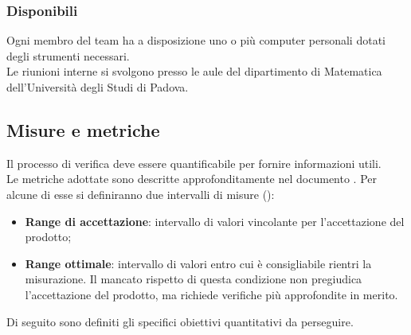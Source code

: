 \documentclass[../PianoDiQualifica.tex]{subfiles}
\begin{document}
			\subsubsection{Disponibili}
				Ogni membro del team ha a disposizione uno o più computer
				personali dotati degli strumenti necessari.\\
				Le riunioni interne si svolgono presso le aule del dipartimento
				di Matematica dell'Università degli Studi di Padova.
		\subsection{Misure e metriche}\label{sez:MisureEMetriche}
			Il processo di verifica deve essere quantificabile per fornire
			informazioni utili.\\
			Le metriche adottate sono descritte approfonditamente nel documento \normediprogetto.
			Per alcune di esse si definiranno due intervalli di misure ():
			\begin{itemize}
				\item \textbf{Range di accettazione}: intervallo di valori
				vincolante per l'accettazione del prodotto;
				\item \textbf{Range ottimale}: intervallo di valori entro cui è
				consigliabile rientri la misurazione. Il mancato rispetto di
				questa condizione non pregiudica l'accettazione del prodotto, ma
				richiede verifiche più approfondite in merito.
			\end{itemize}
			Di seguito sono definiti gli specifici obiettivi quantitativi da perseguire.
\end{document}
